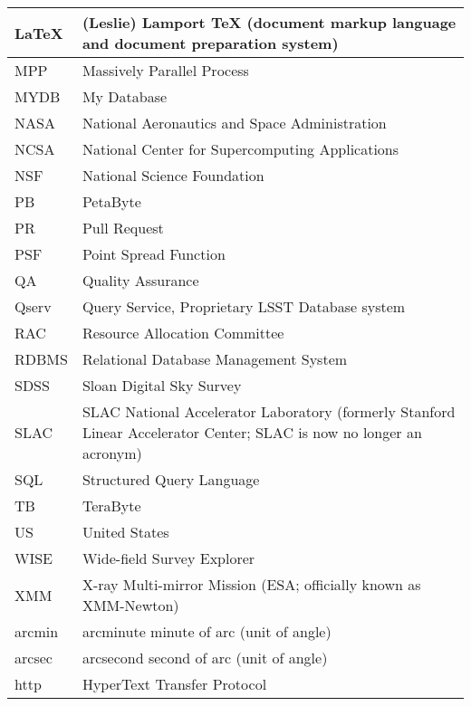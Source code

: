 \begin{longtable}{p{}p{}}
LaTeX & (Leslie) Lamport TeX (document markup language and document preparation system) \\\hline
MPP & Massively Parallel Process \\\hline
MYDB & My Database \\\hline
NASA & National Aeronautics and Space Administration \\\hline
NCSA & National Center for Supercomputing Applications \\\hline
NSF & National Science Foundation \\\hline
PB & PetaByte \\\hline
PR & Pull Request \\\hline
PSF & Point Spread Function \\\hline
QA & Quality Assurance \\\hline
Qserv & Query Service, Proprietary LSST Database system \\\hline
RAC & Resource Allocation Committee \\\hline
RDBMS & Relational Database Management System  \\\hline
SDSS & Sloan Digital Sky Survey \\\hline
SLAC & SLAC National Accelerator Laboratory (formerly Stanford Linear Accelerator Center; SLAC is now no longer an acronym) \\\hline
SQL & Structured Query Language \\\hline
TB & TeraByte \\\hline
US & United States \\\hline
WISE & Wide-field Survey Explorer \\\hline
XMM & X-ray Multi-mirror Mission (ESA; officially known as XMM-Newton) \\\hline
arcmin & arcminute minute of arc (unit of angle) \\\hline
arcsec & arcsecond second of arc (unit of angle) \\\hline
http & HyperText Transfer Protocol \\\hline
\end{longtable}
